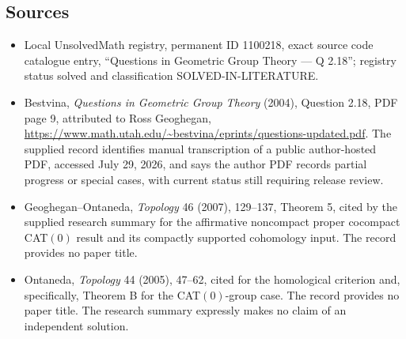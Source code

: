 \documentclass[11pt]{article}
\begin{document}
\subsection{Sources}
\begin{itemize}
\item Local UnsolvedMath registry, permanent ID 1100218, exact source code catalogue entry, ``Questions in Geometric Group Theory --- Q 2.18''; registry status solved and classification SOLVED-IN-LITERATURE.
\item Bestvina, \emph{Questions in Geometric Group Theory} (2004), Question 2.18, PDF page 9, attributed to Ross Geoghegan, \url{https://www.math.utah.edu/~bestvina/eprints/questions-updated.pdf}. The supplied record identifies manual transcription of a public author-hosted PDF, accessed July 29, 2026, and says the author PDF records partial progress or special cases, with current status still requiring release review.
\item Geoghegan--Ontaneda, \emph{Topology} 46 (2007), 129--137, Theorem 5, cited by the supplied research summary for the affirmative noncompact proper cocompact CAT$(0)$ result and its compactly supported cohomology input. The record provides no paper title.
\item Ontaneda, \emph{Topology} 44 (2005), 47--62, cited for the homological criterion and, specifically, Theorem B for the CAT$(0)$-group case. The record provides no paper title. The research summary expressly makes no claim of an independent solution.
\end{itemize}
\end{document}
